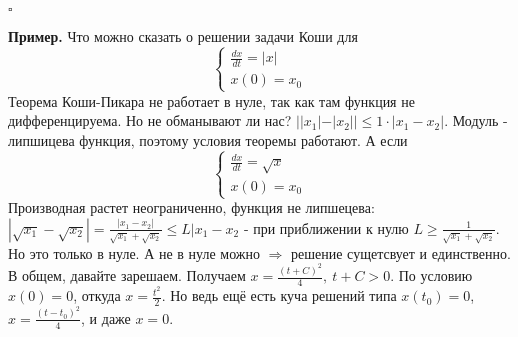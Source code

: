 $\square$


\textbf{Пример.}  Что можно сказать о решении задачи Коши для
$$\begin{cases}
    \frac{dx}{dt}=|x|\\x(0)=x_0
\end{cases}$$
Теорема Коши-Пикара не работает в нуле, так как там функция не дифференцируема.
Но не обманывают ли нас?
$| |x_1|-|x_2| |\leqslant 1\cdot |x_1-x_2|$. Модуль - липшицева функция, 
поэтому условия теоремы работают. 
А если 
$$\begin{cases}
    \frac{dx}{dt}=\sqrt{x} \\x(0)=x_0
\end{cases}$$
Производная растет неограниченно, функция не липшецева: 
$|\sqrt{x_1}-\sqrt{x_2}|=\frac{|x_1-x_2|}{\sqrt{x_1}+\sqrt{x_2}}\leqslant L
|x_1-x_2$ - при приближении к нулю $L\geqslant\frac{1}{\sqrt{x_1}+\sqrt{x_2}}$.
Но это только в нуле. А не в нуле можно $\Rightarrow$ решение сущетсвует и 
единственно. В общем, давайте зарешаем. Получаем $x=\frac{(t+C)^2}{4},~t+C>0$.
По условию $x(0)=0$, откуда $x=\frac{t^2}{2}$. Но ведь ещё есть куча решений
типа $x(t_0)=0$,  $x=\frac{(t-t_0)^2}{4}$, и даже $x=0$. 




